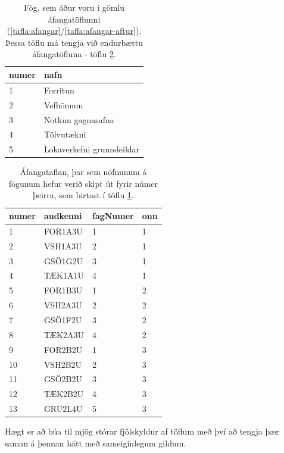 \begin{table}
\centering
\caption[Fög]{Fög, sem áður voru í gömlu áfangatöflunni (\ref{tafla:afangar}/\ref{tafla:afangar-aftur}). Þessa töflu má tengja við endurbættu áfangatöfluna - töflu \ref{tafla:afangar-fagnumer}.}
\label{tafla:fog}
\begin{tabular}{ll}
\toprule
numer&nafn\\
\midrule
1&Forritun\\
2&Vefhönnun\\
3&Notkun gagnasafna\\
4&Tölvutækni\\
5&Lokaverkefni grunndeildar\\
\bottomrule
\end{tabular}
\end{table}

\begin{table}
\centering
\caption[Áfangar - endurbætt]{Áfangataflan, þar sem nöfnunum á fögunum hefur verið skipt út fyrir númer þeirra, sem birtast í töflu \ref{tafla:fog}.}
\label{tafla:afangar-fagnumer}
\begin{tabular}{llll}
\toprule
numer&audkenni&fagNumer&onn\\
\midrule
1&	FOR1A3U&	1&	1\\
2&	VSH1A3U&	2&	1\\
3&	GSÖ1G2U&	3&	1\\
4&	TÆK1A1U&	4&	1\\
5&	FOR1B3U&	1&	2\\
6&	VSH2A3U&	2&	2\\
7&	GSÖ1F2U&	3&	2\\
8&	TÆK2A3U&	4&	2\\
9&	FOR2B2U&	1&	3\\
10&	VSH2B2U&	2&	3\\
11&	GSÖ2B2U&	3&	3\\
12&	TÆK2B2U&	4&	3\\
13&	GRU2L4U&	5&	3\\
\bottomrule
\end{tabular}
\end{table}

Hægt er að búa til mjög stórar fjölskyldur af töflum með því að tengja þær saman á þennan hátt með sameiginlegum gildum.

